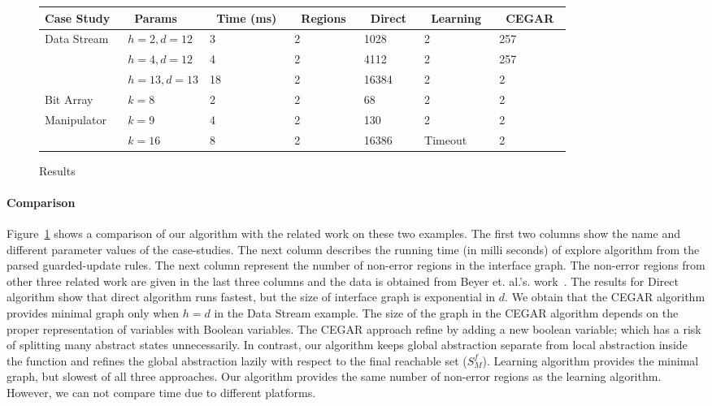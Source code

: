 \documentclass{llncs}
\begin{document}
\begin{figure}[htb]
\begin{tabular}{| l | l| l l |l l l|}
\hline
Case Study\ & \ Params\ \ &\  Time (ms)\ &\ Regions\ &\ Direct\ &\ Learning\ &\ CEGAR\ \\
\hline
Data Stream & $h=2,d=12$ &  3  & 2 & 1028 & 2 & 257\\
                              & $h=4,d=12$ &  4  & 2 & 4112 & 2 & 257\\
                              & $h=13, d=13$ &  18 & 2 & 16384 & 2 & 2\\ 
\hline 
Bit Array           &  $k=8$  & 2 &  2 & 68 & 2 & 2\\
Manipulator     &   $k=9$  & 4  &   2 & 130 & 2 & 2\\
                           &   $k=16$  & 8  &   2 & 16386 & Timeout & 2\\
\hline 
\end{tabular}
\label{results}
\caption{Results}\label{tab-res}
\end{figure}

\paragraph{Comparison}  Figure~\ref{tab-res} shows a comparison of our algorithm with the related work on these two examples.
The first two columns show the name and different parameter values of the case-studies.
The next column describes the running time (in milli seconds) of explore algorithm from the parsed guarded-update rules.  
The next column represent the number of non-error regions in the interface graph.
The non-error regions from other three related work are given in the last three columns and the data is obtained from Beyer et. al.'s. work~\cite{beyerTR06}.
The results for Direct algorithm show that direct algorithm runs fastest, but the size of interface graph is exponential in $d$.
We obtain that the CEGAR algorithm provides minimal graph only when $h=d$ in the Data Stream example.
The size of the graph in the CEGAR algorithm depends on the proper representation of variables with Boolean variables.
The CEGAR approach refine by adding a new boolean variable; which has a risk of splitting many abstract states unnecessarily. 
In contrast, our algorithm keeps global abstraction separate from local abstraction inside the function and 
refines the global abstraction lazily with respect to the final reachable set ($S^f_M$). 
Learning algorithm provides the minimal graph, but slowest of all three approaches.
Our algorithm provides the same number of non-error regions as the learning algorithm. 
However, we can not compare time due to different platforms.
\end{document}
